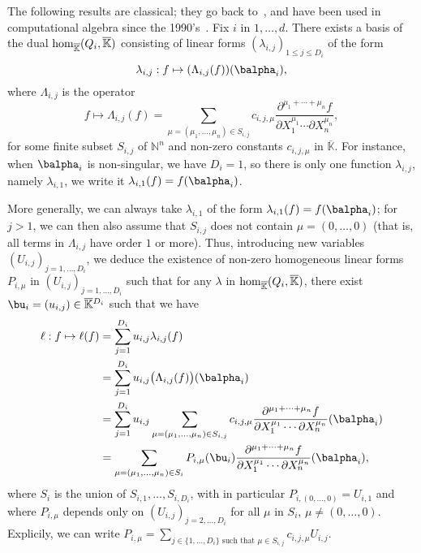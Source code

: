 \documentclass[12pt]{article}
\def\N {\ensuremath{\mathbb{N}}}
\def\Kbar {{\ensuremath{\overline{\mathbb{K}}}}}
\def\D {\ensuremath{D}}
\begin{document}
The following results are classical; they go back
to~\cite{Macaulay16}, and have been used in computational algebra
since the 1990's~\cite{MaMoMo96,Mourrain97}. Fix $i$ in $1,\dots,d$.
There exists a basis of the dual ${\rm hom}_\Kbar(Q_i,\Kbar)$
consisting of linear forms $(\lambda_{i,j})_{1\le j \le \D_i}$ of the
form
$$\lambda_{i,j}: f \mapsto (\Lambda_{i,j}(f))(\balpha_i),$$
where $\Lambda_{i,j}$ is the operator
$$f \mapsto \Lambda_{i,j}(f) = \sum_{\mu=(\mu_1,\dots,\mu_n) \in
	S_{i,j}} c_{i,j,\mu} \frac{ \partial^{\mu_1 + \cdots + \mu_n} f}
{\partial X_1^{\mu_1} \cdots \partial X_n^{\mu_n}},$$ for some finite
subset $S_{i,j}$ of $\N^n$ and non-zero constants $c_{i,j,\mu}$ in
$\Kbar$. 
For instance, when $\balpha_i$ is non-singular, we have $D_i=1$, so
there is only one function $\lambda_{i,j}$, namely $\lambda_{i,1}$, we
write it $\lambda_{i,1}(f) = f(\balpha_i)$.

More generally, we can always take $\lambda_{i,1}$ of the form
$\lambda_{i,1}(f) = f(\balpha_i)$; for $j>1$, we can then also assume
that $S_{i,j}$ does not contain $\mu=(0,\dots,0)$ (that is, all terms
in $\Lambda_{i,j}$ have order $1$ or more). Thus, introducing new
variables $(U_{i,j})_{j =1,\dots,D_i}$, we deduce the existence of
non-zero homogeneous linear forms $P_{i,\mu}$ in
$(U_{i,j})_{j=1,\dots,D_i}$ such that for any $\lambda$ in ${\rm
	hom}_\Kbar(Q_i,\Kbar)$, there exist $\bu_i=(u_{i,j}) \in
\Kbar{}^{D_i}$ such that we have
\begin{align}\label{ell_param}
\ell: f \mapsto \ell(f)
&= \sum_{j=1}^{D_i} u_{i,j} \lambda_{i,j}(f)\nonumber\\
&= \sum_{j=1}^{D_i} u_{i,j} \big(\Lambda_{i,j}(f)\big)(\balpha_i)\nonumber\\
&= \sum_{j=1}^{D_i} u_{i,j}
\sum_{\mu=(\mu_1,\dots,\mu_n) \in
	S_{i,j}} c_{i,j,\mu} \frac{ \partial^{\mu_1 + \cdots + \mu_n} f}
{\partial X_1^{\mu_1} \cdots \partial X_n^{\mu_n}}(\balpha_i)\nonumber\\
&= \sum_{\mu=(\mu_1,\dots,\mu_n) \in S_i} P_{i,\mu}(\bu_i)
\frac{ \partial^{\mu_1 + \cdots + \mu_n} f}
{\partial X_1^{\mu_1} \cdots \partial X_n^{\mu_n}}(\balpha_i),
\end{align}
where $S_i$ is  the union of $S_{i,1},\dots,S_{i,D_i}$,
with in particular $P_{i,(0,\dots,0)}=U_{i,1}$ and where $P_{i,\mu}$
depends only on $(U_{i,j})_{j =2,\dots,D_i}$ for all $\mu$ in $S_i$,
$\mu \ne (0,\dots,0)$. Explicily, we can write $P_{i,\mu}=\sum_{j\in
	\{1,\dots,D_i\} \text{~such that~} \mu \in S_{i,j}} c_{i,j,\mu}
U_{i,j}$. 
\end{document}
